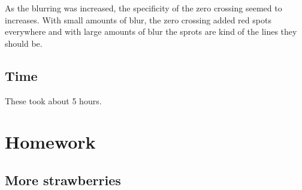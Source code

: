 \documentclass{article}
\begin{document}

As the blurring was increased, the specificity of the zero crossing seemed to increases. With small amounts of blur, the zero crossing added red spots everywhere and with large amounts of blur the sprots are kind of the lines they should be.
\subsection{Time}
These took about 5 hours.
\newpage
\section{Homework}

\subsection{More strawberries}
\end{document}
